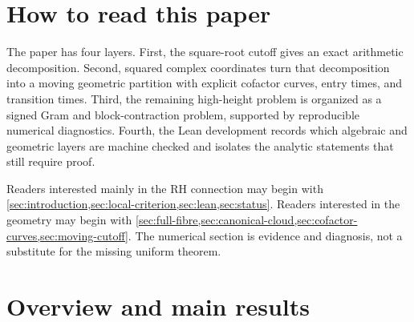 \documentclass[11pt]{article}
\theoremstyle{definition}
\theoremstyle{remark}
\newcommand{\eps}{\varepsilon}
\newcommand{\1}{\mathbf{1}}
\begin{document}
\begin{abstract}
The Riemann Hypothesis enters through the uniform local square-prefix criterion
\[
 \sum_{n=N}^{N+H-1}|S_n|^2\ll_\eps HN^{2+\eps},
 \qquad 1\le H\le N,
\]
whose converse follows by taking $H=1$ and applying square-block interpolation to the classical Mertens criterion.  The accompanying Lean project compiles fifty-five theorem modules covering the exact arithmetic, squared-complex geometry, modulus-$2r$ phase architecture, signed Gram identities, residual decomposition, finite certificate interface, local signed-frame theorem, square-endpoint interpolation, and the canonical low-height occupancy theorem.  The low-sector control is now constructed internally with the sharp nontrivial bound $\lfloor\Lambda\rfloor$ and the single $m=1$ endpoint correction.  The unresolved project mathematics is the native high-sector estimate; the final classical Mertens--RH equivalence remains an ordinary typed theorem argument.  No project axiom or unconditional proof of RH is claimed.
\end{abstract}

\section*{How to read this paper}
The paper has four layers.  First, the square-root cutoff gives an exact arithmetic decomposition.  Second, squared complex coordinates turn that decomposition into a moving geometric partition with explicit cofactor curves, entry times, and transition times.  Third, the remaining high-height problem is organized as a signed Gram and block-contraction problem, supported by reproducible numerical diagnostics.  Fourth, the Lean development records which algebraic and geometric layers are machine checked and isolates the analytic statements that still require proof.

Readers interested mainly in the RH connection may begin with \cref{sec:introduction,sec:local-criterion,sec:lean,sec:status}.  Readers interested in the geometry may begin with \cref{sec:full-fibre,sec:canonical-cloud,sec:cofactor-curves,sec:moving-cutoff}.  The numerical section is evidence and diagnosis, not a substitute for the missing uniform theorem.

\medskip

\section{Overview and main results}
\label{sec:introduction}
\end{document}
